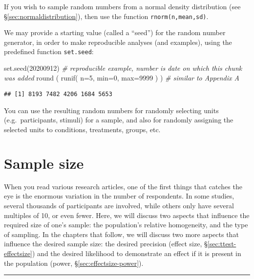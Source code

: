 \documentclass[
]{book}
\newenvironment{Shaded}{\begin{snugshade}}{\end{snugshade}}
\newcommand{\AttributeTok}[1]{\textcolor[rgb]{0.77,0.63,0.00}{#1}}
\newcommand{\CommentTok}[1]{\textcolor[rgb]{0.56,0.35,0.01}{\textit{#1}}}
\newcommand{\DecValTok}[1]{\textcolor[rgb]{0.00,0.00,0.81}{#1}}
\newcommand{\FunctionTok}[1]{\textcolor[rgb]{0.00,0.00,0.00}{#1}}
\newcommand{\NormalTok}[1]{#1}
\begin{document}
If you wish to sample random numbers from a normal density distribution (see §\ref{sec:normaldistribution}), then use the function \texttt{rnorm(n,mean,sd)}.

We may provide a starting value (called a ``seed'') for the random number generator, in order to make reproducible analyses (and examples), using the predefined function \texttt{set.seed}:

\begin{Shaded}
\begin{Highlighting}[]
\FunctionTok{set.seed}\NormalTok{(}\DecValTok{20200912}\NormalTok{) }\CommentTok{\# reproducible example, number is date on which this chunk was added}
\FunctionTok{round}\NormalTok{ ( }\FunctionTok{runif}\NormalTok{( }\AttributeTok{n=}\DecValTok{5}\NormalTok{, }\AttributeTok{min=}\DecValTok{0}\NormalTok{, }\AttributeTok{max=}\DecValTok{9999}\NormalTok{ ) ) }\CommentTok{\# similar to Appendix A}
\end{Highlighting}
\end{Shaded}

\begin{verbatim}
## [1] 8193 7482 4206 1684 5653
\end{verbatim}

You can use the resulting random numbers for randomly selecting units (e.g.~participants, stimuli) for a sample, and also for randomly assigning the selected units to conditions, treatments, groups, etc.

\hypertarget{sec:sample-size}{%
\section{Sample size}\label{sec:sample-size}}

When you read various research articles, one of the first things that catches the eye is the enormous variation in the number of respondents. In some studies, several thousands of participants are involved, while others only have several multiples of 10, or even fewer. Here, we will discuss two aspects that influence the required size of one's sample: the population's relative homogeneity, and the type of sampling. In the chapters that follow, we will discuss two more aspects that influence the desired sample size: the desired precision (effect size, §\ref{sec:ttest-effectsize}) and the desired likelihood to demonstrate an effect if it is present in the population (power, §\ref{sec:effectsize-power}).

\begin{center}\rule{0.5\linewidth}{0.5pt}\end{center}
\end{document}
